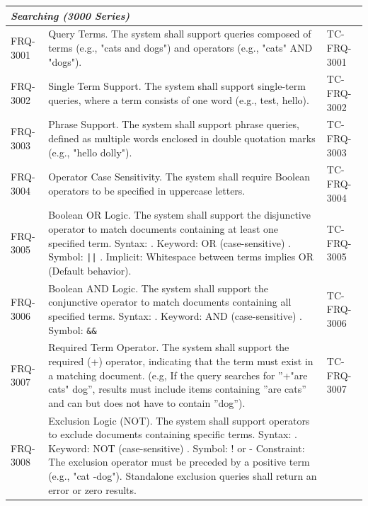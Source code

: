\documentclass{article}
\begin{document}
\begin{longtable}{@{}p{1.7cm} p{9cm} p{4.5cm}@{}}
\midrule
\multicolumn{3}{l}{\textbf{\textit{Searching (3000 Series)}}} \\
\midrule
FRQ-3001 & Query Terms. The system shall support queries composed of terms (e.g., "cats and dogs") and operators (e.g., "cats" AND "dogs").& TC-FRQ-3001\\
FRQ-3002 & Single Term Support. The system shall support single-term queries, where a term consists of one word (e.g., test, hello).& TC-FRQ-3002\\
FRQ-3003 & Phrase Support. The system shall support phrase queries, defined as multiple words enclosed in double quotation marks (e.g., "hello dolly").& TC-FRQ-3003\\

FRQ-3004 & Operator Case Sensitivity. The system shall require Boolean operators to be specified in uppercase letters. & TC-FRQ-3004 \\

FRQ-3005 & Boolean OR Logic. The system shall support the disjunctive operator to match documents containing at least one specified term. \newline
Syntax: \newline
1. Keyword: OR (case-sensitive) \newline
2. Symbol: \texttt{||} \newline
3. Implicit: Whitespace between terms implies OR (Default behavior).& TC-FRQ-3005 \\

FRQ-3006 & Boolean AND Logic. The system shall support the conjunctive operator to match documents containing all specified terms.
Syntax: \newline
1. Keyword: AND (case-sensitive) \newline
2. Symbol: \texttt{\&\&} & TC-FRQ-3006 \\



FRQ-3007 & Required Term Operator. The system shall support the required (+) operator, indicating that the term must exist in a matching document. \newline
            (e.g, If the query searches for ”+"are cats" dog”, results must include items containing ”are cats” and can but does not have to contain ”dog”). & TC-FRQ-3007\\

FRQ-3008 & Exclusion Logic (NOT). The system shall support operators to exclude documents containing specific terms. \newline
Syntax: \newline
1. Keyword: NOT (case-sensitive) \newline
2. Symbol: ! or - \newline
Constraint: The exclusion operator must be preceded by a positive term (e.g., "cat -dog"). Standalone exclusion queries shall return an error or zero results. & \\


\end{longtable}
\end{document}
